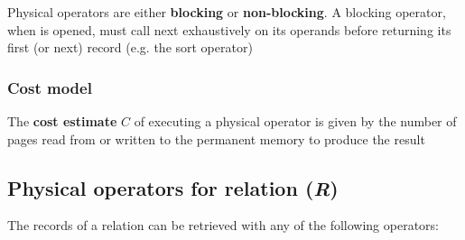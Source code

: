 Physical operators are either \textbf{blocking} or \textbf{non-blocking}. A blocking operator, when is opened, must call next exhaustively on its operands before returning its first (or next) record (e.g. the sort operator)

\subsubsection{Cost model}
The \textbf{cost estimate} $C$ of executing a physical operator is given by the number of pages read from or written to the permanent memory to produce the result

\subsection{Physical operators for relation (\textit{R})}
The records of a relation can be retrieved with any of the following operators:

